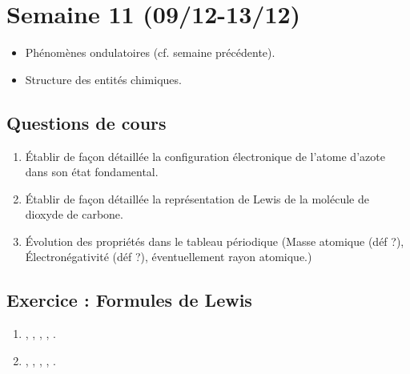 \section{Semaine 11 (09/12-13/12) }


\begin{itemize}
	\item Phénomènes ondulatoires (cf. semaine précédente).
	\item Structure des entités chimiques.
\end{itemize}

\subsection{Questions de cours}

\begin{enumerate}
	\item Établir de façon détaillée la configuration électronique de l'atome d'azote dans son état fondamental.
	\item Établir de façon détaillée la représentation de Lewis de la molécule de dioxyde de carbone.
	\item Évolution des propriétés dans le tableau périodique (Masse atomique (déf ?), Électronégativité (déf ?), éventuellement rayon atomique.)
\end{enumerate}

\subsection{Exercice : Formules de Lewis}

\begin{enumerate}
	\item {}, , , , .
	\item {}, , , , .
\end{enumerate}